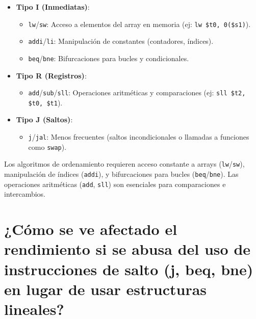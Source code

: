 \documentclass{article}
\begin{document}
\begin{itemize}
\begin{itemize}[label=--]
\begin{itemize}
  \item \textbf{Tipo I (Inmediatas)}:
    \begin{itemize}
      \item \texttt{lw}/\texttt{sw}: Acceso a elementos del array en memoria (ej: \texttt{lw \$t0, 0(\$s1)}).
      \item \texttt{addi}/\texttt{li}: Manipulación de constantes (contadores, índices).
      \item \texttt{beq}/\texttt{bne}: Bifurcaciones para bucles y condicionales.
    \end{itemize}
  \item \textbf{Tipo R (Registros)}:
    \begin{itemize}
      \item \texttt{add}/\texttt{sub}/\texttt{sll}: Operaciones aritméticas y comparaciones (ej: \texttt{sll \$t2, \$t0, \$t1}).
    \end{itemize}
  \item \textbf{Tipo J (Saltos)}:
    \begin{itemize}
      \item \texttt{j}/\texttt{jal}: Menos frecuentes (saltos incondicionales o llamadas a funciones como \texttt{swap}).
    \end{itemize}
\end{itemize}

Los algoritmos de ordenamiento requieren acceso constante a arrays (\texttt{lw}/\texttt{sw}), manipulación de índices (\texttt{addi}), y bifurcaciones para bucles (\texttt{beq}/\texttt{bne}). Las operaciones aritméticas (\texttt{add}, \texttt{sll}) son esenciales para comparaciones e intercambios.

\section{¿Cómo se ve afectado el rendimiento si se abusa del uso de instrucciones de salto (j, beq, 
bne) en lugar de usar estructuras lineales? }


\end{itemize}
\end{itemize}
\end{document}
